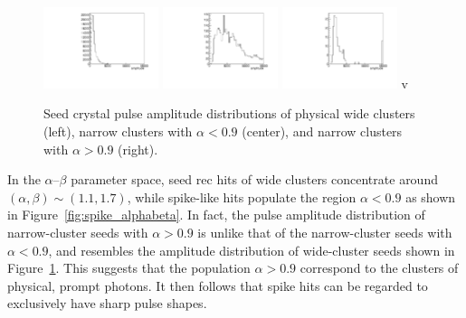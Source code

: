 \begin{figure}[tbp]
  \begin{center}
    \includegraphics[width=0.3\textwidth]{Reconstruction/Figures/spikes/physical_amplitude.pdf}
    \includegraphics[width=0.3\textwidth]{Reconstruction/Figures/spikes/spike_amplitude.pdf}
    \includegraphics[width=0.3\textwidth]{Reconstruction/Figures/spikes/narrow_largealpha_amplitude.pdf}
v    \caption{
      Seed crystal pulse amplitude distributions of physical wide clusters (left), narrow clusters with $\alpha < 0.9$ (center), and narrow clusters with $\alpha > 0.9$ (right).
    }
    \label{fig:spike_amplitudes}
  \end{center}
\end{figure}

In the $\alpha$--$\beta$ parameter space, seed rec hits of wide clusters concentrate around $(\alpha, \beta) \sim (1.1, 1.7)$, while spike-like hits populate the region $\alpha < 0.9$ as shown in Figure~\ref{fig:spike_alphabeta}.
In fact, the pulse amplitude distribution of narrow-cluster seeds with $\alpha > 0.9$ is unlike that of the narrow-cluster seeds with $\alpha < 0.9$, and resembles the amplitude distribution of wide-cluster seeds shown in Figure~\ref{fig:spike_amplitudes}.
This suggests that the population $\alpha > 0.9$ correspond to the clusters of physical, prompt photons.
It then follows that spike hits can be regarded to exclusively have sharp pulse shapes.

